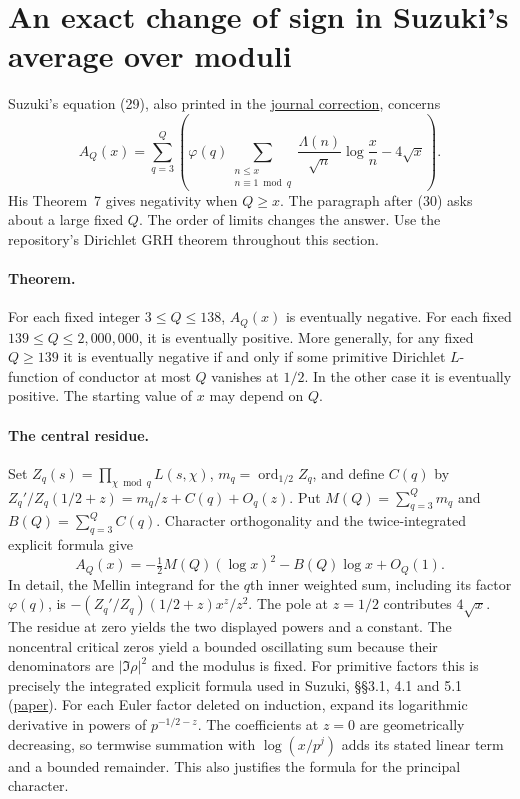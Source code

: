 \section{An exact change of sign in Suzuki's average over moduli}
\label{sec:fixed-suzuki}
Suzuki's equation (29), also printed in the \href{https://doi.org/10.1007/s11139-025-01289-y}{journal correction}, concerns
\[
 A_Q(x)=\sum_{q=3}^Q\left(
 \varphi(q)\sum_{\substack{n\le x\\n\equiv1\bmod q}}
       \frac{\Lambda(n)}{\sqrt n}\log\frac{x}{n}-4\sqrt x\right).
\]
His Theorem~7 gives negativity when $Q\ge x$. The paragraph after (30)
asks about a large fixed $Q$. The order of limits changes the answer.
Use the repository's Dirichlet GRH theorem throughout this section.

\paragraph{Theorem.}
For each fixed integer $3\le Q\le138$, $A_Q(x)$ is eventually negative.
For each fixed $139\le Q\le2{,}000{,}000$, it is eventually positive.
More generally, for any fixed $Q\ge139$ it is eventually negative if and
only if some primitive Dirichlet $L$-function of conductor at most $Q$
vanishes at $1/2$. In the other case it is eventually positive.
The starting value of $x$ may depend on $Q$.

\paragraph{The central residue.}
Set $Z_q(s)=\prod_{\chi\bmod q}L(s,\chi)$, $m_q=\operatorname{ord}_{1/2}Z_q$,
and define $C(q)$ by $Z_q'/Z_q(1/2+z)=m_q/z+C(q)+O_q(z)$.
Put $M(Q)=\sum_{q=3}^Q m_q$ and $B(Q)=\sum_{q=3}^Q C(q)$.
Character orthogonality and the twice-integrated explicit formula give
\[
 A_Q(x)=-\tfrac12 M(Q)(\log x)^2-B(Q)\log x+O_Q(1).
\]
In detail, the Mellin integrand for the $q$th inner weighted sum, including
its factor $\varphi(q)$, is $-(Z_q'/Z_q)(1/2+z)x^z/z^2$.
The pole at $z=1/2$ contributes $4\sqrt x$. The residue at zero yields
the two displayed powers and a constant. The noncentral critical zeros
yield a bounded oscillating sum because their denominators are
$|\Im\rho|^2$ and the modulus is fixed.
For primitive factors this is precisely the integrated explicit formula
used in Suzuki, \S\S3.1, 4.1 and 5.1
(\href{https://arxiv.org/html/2411.07436v3}{paper}).
For each Euler factor deleted on induction, expand its logarithmic
derivative in powers of $p^{-1/2-z}$. The coefficients at $z=0$ are
geometrically decreasing, so termwise summation with $\log(x/p^j)$
adds its stated linear term and a bounded remainder. This also justifies
the formula for the principal character.

